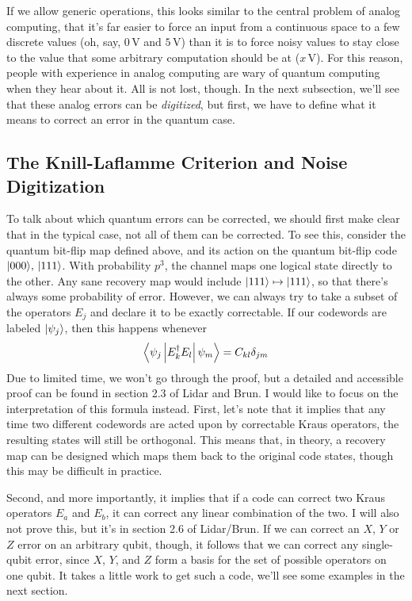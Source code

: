 \documentclass[10pt,a4paper, english]{scrartcl}
\providecommand{\volts}{\, \textrm{V}}
\begin{document}
If we allow generic operations, this looks similar to the central problem of analog computing, that it's far easier to force an input from a continuous space to a few discrete values (oh, say, $0 \volts$ and $5 \volts$) than it is to force noisy values to stay close to the value that some arbitrary computation should be at ($x \volts$). 
For this reason, people with experience in analog computing are wary of quantum computing when they hear about it. 
All is not lost, though. 
In the next subsection, we'll see that these analog errors can be \emph{digitized}, but first, we have to define what it means to correct an error in the quantum case.
\subsection{The Knill-Laflamme Criterion and Noise Digitization}
To talk about which quantum errors can be corrected, we should first make clear that in the typical case, not all of them can be corrected. 
To see this, consider the quantum bit-flip map defined above, and its action on the quantum bit-flip code ${\left\vert{000}\right\rangle},\,{\left\vert{111}\right\rangle}$.
With probability $p^3$, the channel maps one logical state directly to the other. 
Any sane recovery map would include ${\left\vert{111}\right\rangle} \mapsto {\left\vert{111}\right\rangle}$, so that there's always some probability of error. 
However, we can always try to take a subset of the operators $E_j$ and declare it to be exactly correctable. 
If our codewords are labeled ${\left\vert{\psi_j}\right\rangle}$, then this happens whenever
\begin{equation}
\elem{\psi_j}{E_k\ct E_l}{\psi_m} = C_{kl} \delta_{jm}
\end{equation}
Due to limited time, we won't go through the proof, but a detailed and accessible proof can be found in section 2.3 of Lidar and Brun. 
I would like to focus on the interpretation of this formula instead. 
First, let's note that it implies that any time two different codewords are acted upon by correctable Kraus operators, the resulting states will still be orthogonal. 
This means that, in theory, a recovery map can be designed which maps them back to the original code states, though this may be difficult in practice. 

Second, and more importantly, it implies that if a code can correct two Kraus operators $E_a$ and $E_b$, it can correct any linear combination of the two.
I will also not prove this, but it's in section 2.6 of Lidar/Brun.
If we can correct an $X$, $Y$ or $Z$ error on an arbitrary qubit, though, it follows that we can correct any single-qubit error, since $X$, $Y$, and $Z$ form a basis for the set of possible operators on one qubit.
It takes a little work to get such a code, we'll see some examples in the next section. 
\end{document}
